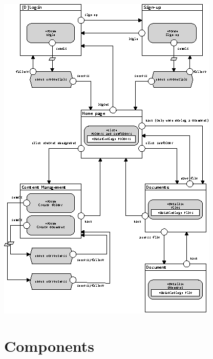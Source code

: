 \documentclass[a4paper, dvipsnames]{article}
\begin{document}
	\begin{center}
		\includegraphics[width=0.95\columnwidth]{ifml}
	\end{center}
	
	\pagebreak
	
	\section{Components}
	
\end{document}
